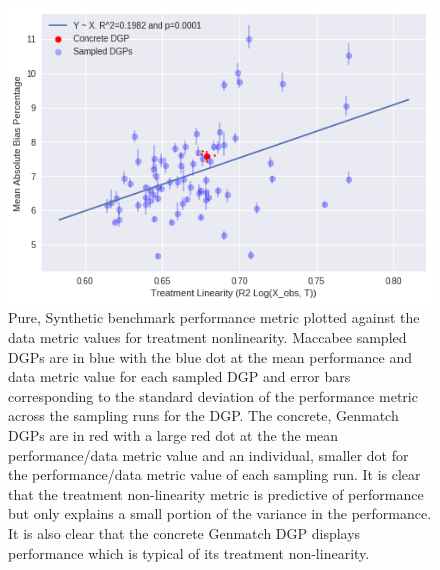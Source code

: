 \documentclass[../main.tex]{subfiles}
\begin{document}
\begin{figure}[ht!]
    \centering
    \includegraphics[width=0.9\linewidth]{figures/ch7-benchmark-pure-synth-2.png}
    \caption{Pure, Synthetic benchmark performance metric plotted against the data metric values for treatment nonlinearity. Maccabee sampled DGPs are in blue with the blue dot at the mean performance and data metric value for each sampled DGP and error bars corresponding to the standard deviation of the performance metric across the sampling runs for the DGP. The concrete, Genmatch DGPs are in red with a large red dot at the the mean performance/data metric value and an individual, smaller dot for the performance/data metric value of each sampling run. It is clear that the treatment non-linearity metric is predictive of performance but only explains a small portion of the variance in the performance. It is also clear that the concrete Genmatch DGP displays performance which is typical of its treatment non-linearity.}
    \label{fig:benchmark-validation-pure-synth-2}
\end{figure}
\FloatBarrier
\end{document}
